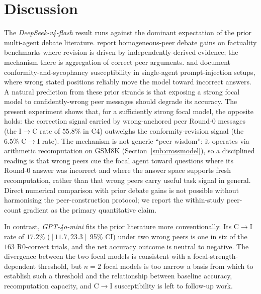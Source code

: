 \documentclass[review,3p,authoryear]{elsarticle}
\begin{document}
\section{Discussion}
\label{sec:discussion}

The \textit{DeepSeek-v4-flash} result runs against the dominant
expectation of the prior multi-agent debate literature.
\citet{du2023improving} report homogeneous-peer debate gains on
factuality benchmarks where revision is driven by
independently-derived evidence; the mechanism there is aggregation of
correct peer arguments.
\citet{koo2024benchmarking} and \citet{sharma2023towards} document
conformity-and-sycophancy susceptibility in single-agent
prompt-injection setups, where wrong stated positions reliably move
the model toward incorrect answers.
A natural prediction from these prior strands is that exposing a
strong focal model to confidently-wrong peer messages should degrade
its accuracy.
The present experiment shows that, for a sufficiently strong focal
model, the opposite holds: the correction signal carried by
wrong-anchored peer Round-0 messages (the I$\rightarrow$C rate of
$55.8\%$ in C4) outweighs the conformity-revision signal (the $6.5\%$
C$\rightarrow$I rate).
The mechanism is not generic ``peer wisdom'': it operates via
arithmetic recomputation on GSM8K (Section~\ref{sub:crossmodel}), so
a disciplined reading is that wrong peers cue the focal agent toward
questions where its Round-0 answer was incorrect and where the answer
space supports fresh recomputation, rather than that wrong peers
carry useful task signal in general.
Direct numerical comparison with prior debate gains is not possible
without harmonising the peer-construction protocol; we report the
within-study peer-count gradient as the primary quantitative claim.

In contrast, \textit{GPT-4o-mini} fits the prior literature more
conventionally.
Its C$\rightarrow$I rate of $17.2\%$ ($[11.7, 23.3]$ 95\% CI) under
two wrong peers is one in six of the $163$ R0-correct trials, and the
net accuracy outcome is neutral to negative.
The divergence between the two focal models is consistent with a
focal-strength-dependent threshold, but $n = 2$ focal models is too
narrow a basis from which to establish such a threshold and the
relationship between baseline accuracy, recomputation capacity, and
C$\rightarrow$I susceptibility is left to follow-up work.
\end{document}
